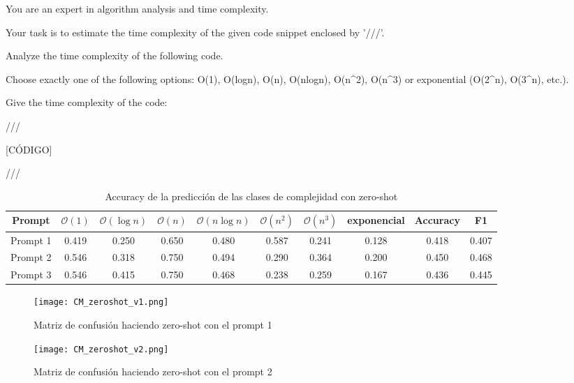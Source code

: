 \documentclass[12pt,twoside]{article}
\begin{document}
\begin{tcolorbox}[
  colback=gray!5,
  colframe=black,
  boxrule=0.5pt,
  breakable,
  title=Prompt 3 zero-shot,
]
You are an expert in algorithm analysis and time complexity.

Your task is to estimate the time complexity of the given code snippet enclosed by '///'.

Analyze the time complexity of the following code.

Choose exactly one of the following options: O(1), O(logn), O(n), O(nlogn), O(n\textasciicircum2), O(n\textasciicircum3) or exponential (O(2\textasciicircum n), O(3\textasciicircum n), etc.).

Give the time complexity of the code:

///

[CÓDIGO]

///
\end{tcolorbox}

\begin{table}[H]
    \small
    \centering
    \begin{tabular}{c|c c c c c c c|c c}
        Prompt & $\mathcal{O}(1)$ & $\mathcal{O}(\log n)$ & $\mathcal{O}(n)$ & $\mathcal{O}(n\log n)$ & $\mathcal{O}(n^2)$ & $\mathcal{O}(n^3)$ & exponencial & Accuracy & F1 \\ \hline
        Prompt 1 & 0.419 & 0.250 & 0.650 & 0.480 & 0.587 & 0.241 & 0.128 & 0.418 & 0.407 \\
        Prompt 2 & 0.546 & 0.318 & 0.750 & 0.494 & 0.290 & 0.364 & 0.200 & 0.450 & 0.468 \\
        Prompt 3 & 0.546 & 0.415 & 0.750 & 0.468 & 0.238 & 0.259 & 0.167 & 0.436 & 0.445
    \end{tabular}
    \normalsize
    \caption{Accuracy de la predicción de las clases de complejidad con zero-shot}
    \label{tab:tab_zs}
\end{table}

\begin{figure}[H]
  \centering
    \texttt{[image: CM\_zeroshot\_v1.png]}
  \caption{Matriz de confusión haciendo zero-shot con el prompt 1}
  \label{fig:confmat_zs1}
\end{figure}

\begin{figure}[H]
  \centering
    \texttt{[image: CM\_zeroshot\_v2.png]}
  \caption{Matriz de confusión haciendo zero-shot con el prompt 2}
  \label{fig:confmat_zs2}
\end{figure}
\end{document}
